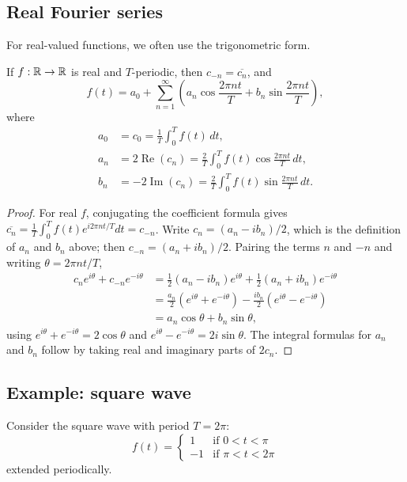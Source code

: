 \begin{notechapter}
\subsection{Real Fourier series}

For real-valued functions, we often use the trigonometric form.

\begin{proposition}
If $f:\mathbb{R} \to \mathbb{R}$ is real and $T$-periodic, then $c_{-n} = \overline{c_n}$, and
\[
f(t) = a_0 + \sum_{n=1}^{\infty} \left( a_n \cos\frac{2\pi n t}{T} + b_n \sin\frac{2\pi n t}{T} \right),
\]
where
\begin{align*}
a_0 &= c_0 = \frac{1}{T} \int_0^T f(t) \, dt, \\
a_n &= 2\operatorname{Re}(c_n) = \frac{2}{T} \int_0^T f(t) \cos\frac{2\pi n t}{T} \, dt, \\
b_n &= -2\operatorname{Im}(c_n) = \frac{2}{T} \int_0^T f(t) \sin\frac{2\pi n t}{T} \, dt.
\end{align*}
\end{proposition}

\begin{proof}
For real $f$, conjugating the coefficient formula gives $\overline{c_n} = \frac1T\int_0^T f(t)e^{i2\pi nt/T}dt = c_{-n}$. Write $c_n = (a_n - i b_n)/2$, which is the definition of $a_n$ and $b_n$ above; then $c_{-n} = (a_n + ib_n)/2$. Pairing the terms $n$ and $-n$ and writing $\theta = 2\pi n t/T$,
\begin{align*}
c_n e^{i\theta} + c_{-n} e^{-i\theta}
&= \tfrac12(a_n - ib_n)e^{i\theta} + \tfrac12(a_n + ib_n)e^{-i\theta} \\
&= \tfrac{a_n}{2}\left(e^{i\theta} + e^{-i\theta}\right) - \tfrac{ib_n}{2}\left(e^{i\theta} - e^{-i\theta}\right) \\
&= a_n \cos\theta + b_n \sin\theta,
\end{align*}
using $e^{i\theta}+e^{-i\theta} = 2\cos\theta$ and $e^{i\theta}-e^{-i\theta} = 2i\sin\theta$. The integral formulas for $a_n$ and $b_n$ follow by taking real and imaginary parts of $2c_n$.
\end{proof}

\subsection{Example: square wave}

\begin{example}
Consider the square wave with period $T = 2\pi$:
\[
f(t) = \begin{cases}
1 & \text{if } 0 < t < \pi \\
-1 & \text{if } \pi < t < 2\pi
\end{cases}
\]
extended periodically.


\end{example}
\end{notechapter}

